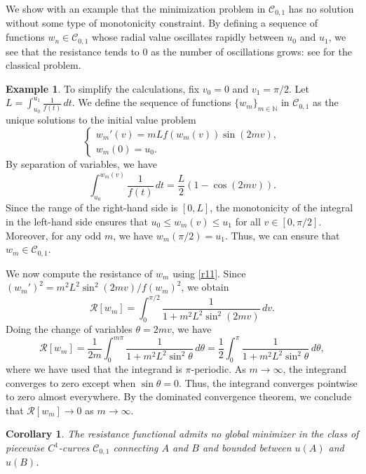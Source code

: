 \documentclass[a4paper,12pt]{amsart}
\newtheorem{corollary}[theorem]{Corollary}
\theoremstyle{definition}
\newtheorem{example}[theorem]{Example}
\begin{document}
We show with an example that the minimization problem in $\mathcal{C}_{0,1}$ has no solution without some type of monotonicity constraint. By defining a sequence of functions $w_n \in \mathcal{C}_{0,1}$ whose radial value oscillates rapidly between $u_0$ and $u_1$, we see that the resistance tends to $0$ as the number of oscillations grows: see \cite{le} for the classical problem.


\begin{example}
To simplify the calculations, fix $v_0=0$ and $v_1=\pi/2$. Let $L = \int_{u_0}^{u_1} \frac{1}{f(t)} \, dt$. We define the sequence of functions $\{w_m\}_{m\in\mathbb{N}}$ in $\mathcal{C}_{0,1}$ as the unique solutions to the   initial value problem
\begin{equation*}
\begin{cases} 
w_m'(v) = m L f(w_m(v)) \sin(2mv), \\
w_m(0) = u_0.
\end{cases}
\end{equation*}
By separation of variables, we have 
$$\int_{u_0}^{w_m(v)} \frac{1}{f(t)} \, dt = \frac{L}{2} (1 - \cos(2mv)).$$
 Since the range of the right-hand side is $[0, L]$, the monotonicity of the integral in the left-hand side ensures that  $u_0 \leq w_m(v) \leq u_1$ for all $v \in [0, \pi/2]$. Moreover, for any odd  $m$, we have $w_m(\pi/2) = u_1$. Thus, we can ensure that $w_m \in \mathcal{C}_{0,1}$. 
 
We now compute  the resistance of $w_m$ using \eqref{r11}. Since  $(w_m')^2 = m^2 L^2 \sin^2(2mv)/f(w_m)^2$,   we obtain
$$\mathcal{R}[w_m] =   \int_0^{\pi/2} \frac{1}{1 + m^2 L^2 \sin^2(2mv)} \, dv.$$
Doing   the change of variables $\theta = 2mv$, we have
$$\mathcal{R}[w_m] = \frac{1}{2m} \int_0^{m\pi} \frac{1}{1 + m^2 L^2 \sin^2 \theta} \, d\theta = \frac{1}{2} \int_0^{\pi} \frac{1}{1 + m^2 L^2 \sin^2 \theta} \, d\theta,$$
where we have used that the integrand is $\pi$-periodic. 
As $m \to \infty$, the integrand converges to zero except when $\sin\theta=0$. Thus, the integrand converges  pointwise to zero  almost   everywhere. By the dominated convergence theorem, we conclude that $\mathcal{R}[w_m] \to 0$ as $m \to \infty$.
\end{example}
 
 
 \begin{corollary}
The resistance functional admits no global minimizer in the class of piecewise $C^1$-curves $\mathcal{C}_{0,1}$ connecting $A$ and $B$ and bounded between $u(A)$ and $u(B)$.
\end{corollary}
\end{document}
